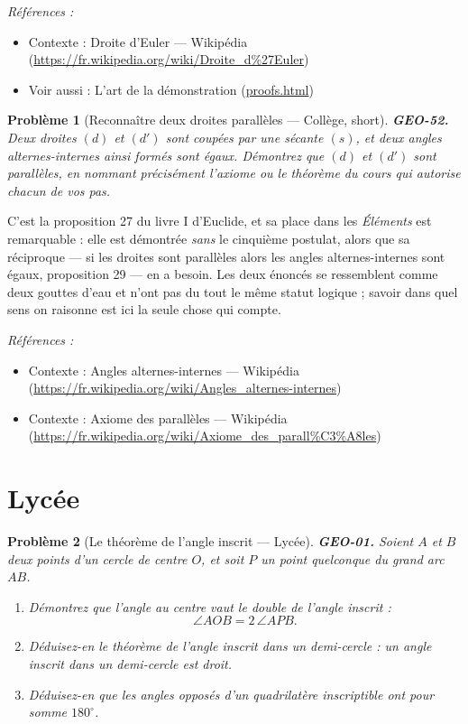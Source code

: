 \documentclass[11pt]{article}
\newtheorem{problem}{Problème}
\newenvironment{refs}{\par\small\noindent\emph{Références :}\begin{itemize}\setlength\itemsep{0pt}}{\end{itemize}\normalsize}
\begin{document}
\begin{refs}
\item Contexte : Droite d'Euler --- Wikipédia (\url{https://fr.wikipedia.org/wiki/Droite_d%27Euler})
\item Voir aussi : L'art de la démonstration (\url{proofs.html})
\end{refs}

\bigskip

\begin{problem}[{Reconnaître deux droites parallèles --- Collège, short}]
\textbf{GEO-52.} Deux droites $ (d) $ et $ (d') $ sont coupées par une
sécante $ (s) $, et deux angles alternes-internes ainsi formés sont égaux. Démontrez que $ (d) $
et $ (d') $ sont parallèles, en nommant précisément l'axiome ou le théorème du cours qui autorise
chacun de vos pas.
\end{problem}

\noindent C'est la proposition 27 du livre I d'Euclide, et sa place dans les \textit{Éléments}
est remarquable : elle est démontrée \textit{sans} le cinquième postulat, alors que sa réciproque --- si
les droites sont parallèles alors les angles alternes-internes sont égaux, proposition 29 --- en a
besoin. Les deux énoncés se ressemblent comme deux gouttes d'eau et n'ont pas du tout le même statut
logique ; savoir dans quel sens on raisonne est ici la seule chose qui compte.

\begin{refs}
\item Contexte : Angles alternes-internes --- Wikipédia (\url{https://fr.wikipedia.org/wiki/Angles_alternes-internes})
\item Contexte : Axiome des parallèles --- Wikipédia (\url{https://fr.wikipedia.org/wiki/Axiome_des_parall%C3%A8les})
\end{refs}

\bigskip


\section*{Lycée}

\begin{problem}[{Le théorème de l'angle inscrit --- Lycée}]
\textbf{GEO-01.} Soient $ A $ et $ B $ deux points d'un cercle de centre $ O $,
et soit $ P $ un point quelconque du grand arc $ AB $.
\begin{enumerate}
\item[(a)] Démontrez que l'angle au centre vaut le double de l'angle inscrit :
\[ \angle AOB = 2\,\angle APB. \]
\item[(b)] Déduisez-en le théorème de l'angle inscrit dans un demi-cercle : un angle inscrit dans un demi-cercle est droit.
\item[(c)] Déduisez-en que les angles opposés d'un quadrilatère inscriptible ont pour somme $ 180^\circ $.
\end{enumerate}

\end{problem}
\end{document}
